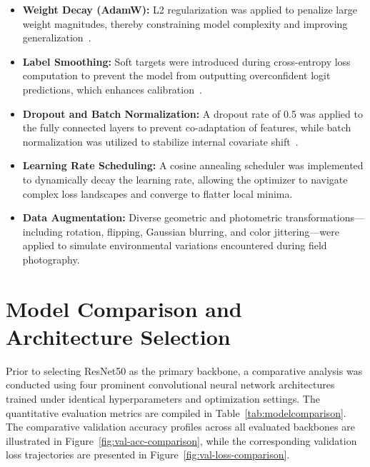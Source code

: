 \begin{itemize}
    \item \textbf{Weight Decay (AdamW):} L2 regularization was applied to penalize large weight magnitudes, thereby constraining model complexity and improving generalization~\cite{loshchilov2019adamw}.
    
    \item \textbf{Label Smoothing:} Soft targets were introduced during cross-entropy loss computation to prevent the model from outputting overconfident logit predictions, which enhances calibration~\cite{muller2019label}.
    
    \item \textbf{Dropout and Batch Normalization:} A dropout rate of 0.5 was applied to the fully connected layers to prevent co-adaptation of features, while batch normalization was utilized to stabilize internal covariate shift~\cite{he2016deep}.
    
    \item \textbf{Learning Rate Scheduling:} A cosine annealing scheduler was implemented to dynamically decay the learning rate, allowing the optimizer to navigate complex loss landscapes and converge to flatter local minima.
    
    \item \textbf{Data Augmentation:} Diverse geometric and photometric transformations---including rotation, flipping, Gaussian blurring, and color jittering---were applied to simulate environmental variations encountered during field photography.
\end{itemize}

\section{Model Comparison and Architecture Selection}

Prior to selecting ResNet50 as the primary backbone, a comparative analysis was conducted using four prominent convolutional neural network architectures trained under identical hyperparameters and optimization settings. The quantitative evaluation metrics are compiled in Table~\ref{tab:modelcomparison}. The comparative validation accuracy profiles across all evaluated backbones are illustrated in Figure~\ref{fig:val-acc-comparison}, while the corresponding validation loss trajectories are presented in Figure~\ref{fig:val-loss-comparison}.

